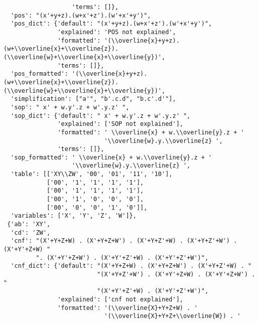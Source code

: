 \begin{verbatim}
                   'terms': []},
  'pos': "(x'+y+z).(w+x'+z').(w'+x'+y')",
  'pos_dict': {'default': "(x'+y+z).(w+x'+z').(w'+x'+y')",
               'explained': 'POS not explained',
               'formatted': '(\\overline{x}+y+z).(w+\\overline{x}+\\overline{z}).(\\overline{w}+\\overline{x}+\\overline{y})',
               'terms': []},
  'pos_formatted': '(\\overline{x}+y+z).(w+\\overline{x}+\\overline{z}).(\\overline{w}+\\overline{x}+\\overline{y})',
  'simplification': ["a'", "b'.c.d", "b.c'.d'"],
  'sop': " x' + w.y'.z + w'.y.z' ",
  'sop_dict': {'default': " x' + w.y'.z + w'.y.z' ",
               'explained': ['SOP not explained'],
               'formatted': ' \\overline{x} + w.\\overline{y}.z + '
                            '\\overline{w}.y.\\overline{z} ',
               'terms': []},
  'sop_formatted': ' \\overline{x} + w.\\overline{y}.z + '
                   '\\overline{w}.y.\\overline{z} ',
  'table': [['XY\\ZW', '00', '01', '11', '10'],
            ['00', '1', '1', '1', '1'],
            ['00', '1', '1', '1', '1'],
            ['00', '1', '0', '0', '0'],
            ['00', '0', '0', '1', '0']],
  'variables': ['X', 'Y', 'Z', 'W']},
 {'ab': 'XY',
  'cd': 'ZW',
  'cnf': "(X'+Y+Z+W) . (X'+Y+Z+W') . (X'+Y+Z'+W) . (X'+Y+Z'+W') . (X'+Y'+Z+W) "
         ". (X'+Y'+Z+W') . (X'+Y'+Z'+W) . (X'+Y'+Z'+W')",
  'cnf_dict': {'default': "(X'+Y+Z+W) . (X'+Y+Z+W') . (X'+Y+Z'+W) . "
                          "(X'+Y+Z'+W') . (X'+Y'+Z+W) . (X'+Y'+Z+W') . "
                          "(X'+Y'+Z'+W) . (X'+Y'+Z'+W')",
               'explained': ['cnf not explained'],
               'formatted': '(\\overline{X}+Y+Z+W) . '
                            '(\\overline{X}+Y+Z+\\overline{W}) . '

\end{verbatim}
